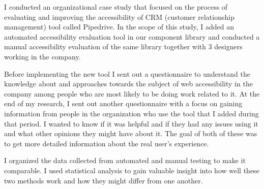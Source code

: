 \documentclass{master_thesis}
\begin{document}
I conducted an organizational case study that focused on the process of evaluating and improving the accessibility of CRM (customer relationship management) tool called Pipedrive. In the scope of this study, I added an automated accessibility evaluation tool in our component library and conducted a manual accessibility evaluation of the same library together with 3 designers working in the company.

Before implementing the new tool I sent out a questionnaire to understand the knowledge about and approaches towards the subject of web accessibility in the company among people who are most likely to be doing work related to it. At the end of my research, I sent out another questionnaire with a focus on gaining information from people in the organization who use the tool that I added during that period. I wanted to know if it was helpful and if they had any issues using it and what other opinions they might have about it. The goal of both of these was to get more detailed information about the real user's experience.

I organized the data collected from automated and manual testing to make it comparable. I used statistical analysis to gain valuable insight into how well these two methods work and how they might differ from one another.
\end{document}
